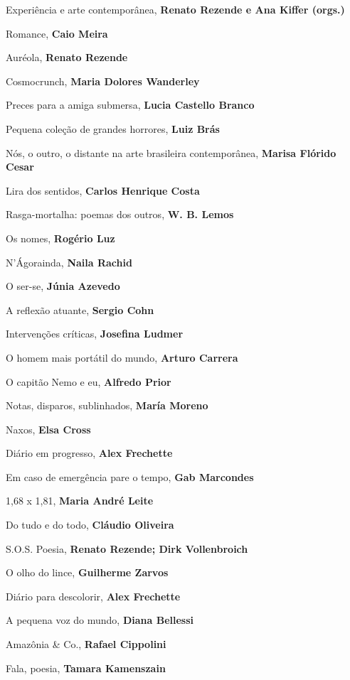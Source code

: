 \begin{multicols}{2}
\begin{enumerate}
{\item Experiência e arte contemporânea,  \textbf{Renato Rezende e Ana Kiffer (orgs.)}
\item Romance, \textbf{Caio Meira}
\item Auréola, \textbf{Renato Rezende}
\item Cosmocrunch, \textbf{Maria Dolores Wanderley}
\item Preces para a amiga submersa, \textbf{Lucia Castello Branco}
\item Pequena coleção de grandes horrores, \textbf{Luiz Brás}
\item Nós, o outro, o distante na arte brasileira contemporânea, \textbf{Marisa Flórido Cesar}
\item Lira dos sentidos, \textbf{Carlos Henrique Costa}
\item Rasga-mortalha: poemas dos outros, \textbf{W. B. Lemos}
\item Os nomes, \textbf{Rogério Luz}
\item N’Ágorainda, \textbf{Naila Rachid}
\item O ser-se, \textbf{Júnia Azevedo}
\item A reflexão atuante, \textbf{Sergio Cohn}
\item Intervenções críticas, \textbf{Josefina Ludmer}
\item O homem mais portátil do mundo, \textbf{Arturo Carrera}
\item O capitão Nemo e eu, \textbf{Alfredo Prior}
\item Notas, disparos, sublinhados, \textbf{María Moreno}
\item Naxos, \textbf{Elsa Cross}
\item Diário em progresso, \textbf{Alex Frechette}
\item Em caso de emergência pare o tempo, \textbf{Gab Marcondes}
\item 1,68 x 1,81, \textbf{Maria André Leite}
\item Do tudo e do todo, \textbf{Cláudio Oliveira}
\item S.O.S. Poesia, \textbf{Renato Rezende; Dirk Vollenbroich}
\item O olho do lince, \textbf{Guilherme Zarvos}
\item Diário para descolorir, \textbf{Alex Frechette}
\item A pequena voz do mundo, \textbf{Diana Bellessi}
\item Amazônia \& Co., \textbf{Rafael Cippolini}
\item Fala, poesia, \textbf{Tamara Kamenszain}
}
\end{enumerate}
\end{multicols}
